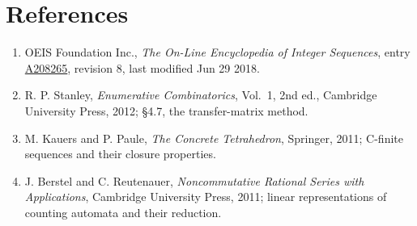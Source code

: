 \documentclass[11pt]{article}
\theoremstyle{definition}
\begin{document}
\section{References}

\begin{enumerate}

\item OEIS Foundation Inc., \emph{The On-Line Encyclopedia of Integer Sequences}, entry \href{https://oeis.org/A208265}{A208265}, revision 8, last modified Jun 29 2018.

\item R. P. Stanley, \emph{Enumerative Combinatorics}, Vol.~1, 2nd ed., Cambridge University Press, 2012; \S4.7, the transfer-matrix method.

\item M. Kauers and P. Paule, \emph{The Concrete Tetrahedron}, Springer, 2011; C-finite sequences and their closure properties.

\item J. Berstel and C. Reutenauer, \emph{Noncommutative Rational Series with Applications}, Cambridge University Press, 2011; linear representations of counting automata and their reduction.

\end{enumerate}
\end{document}
